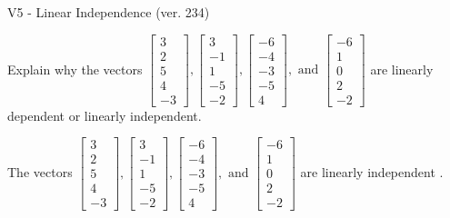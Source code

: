 \begin{exercise}
  \begin{exerciseTitle}V5 - Linear Independence (ver. 234)\end{exerciseTitle}
  \begin{exerciseStatement}
    Explain why the vectors \(\left[\begin{array}{r}
3 \\
2 \\
5 \\
4 \\
-3
\end{array}\right] , \left[\begin{array}{r}
3 \\
-1 \\
1 \\
-5 \\
-2
\end{array}\right] , \left[\begin{array}{r}
-6 \\
-4 \\
-3 \\
-5 \\
4
\end{array}\right] , \text{ and } \left[\begin{array}{r}
-6 \\
1 \\
0 \\
2 \\
-2
\end{array}\right]\) are linearly dependent or linearly independent.	


  \end{exerciseStatement}
  \begin{exerciseAnswer}
   The vectors \(\left[\begin{array}{r}
3 \\
2 \\
5 \\
4 \\
-3
\end{array}\right] , \left[\begin{array}{r}
3 \\
-1 \\
1 \\
-5 \\
-2
\end{array}\right] , \left[\begin{array}{r}
-6 \\
-4 \\
-3 \\
-5 \\
4
\end{array}\right] , \text{ and } \left[\begin{array}{r}
-6 \\
1 \\
0 \\
2 \\
-2
\end{array}\right]\) are 
  	 linearly independent  .
  


  \end{exerciseAnswer}
\end{exercise}